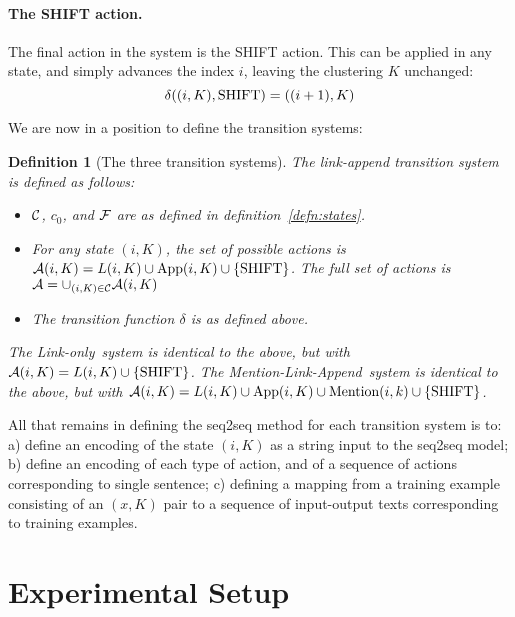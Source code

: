 \documentclass[11pt,a4paper]{article}
\newtheorem{definition}{Definition}
\newcommand{\M}{Mention-Link-Append}
\newcommand{\LO}{Link-only}
\begin{document}
\paragraph{The SHIFT action.}
The final action in the system is the SHIFT action. This can be applied in any state, and simply advances the index $i$, leaving the clustering $K$ unchanged:
\[
\delta((i,K), \hbox{SHIFT}) = ( (i+1), K)
\]

We are now in a position to define the transition systems:

\begin{definition}[The three transition systems]
The link-append transition system is defined as follows:
\begin{itemize}
    \item ${\cal C}$, $c_0$, and ${\cal F}$ are as defined in definition~\ref{defn:states}.
    \item For any state $(i, K)$, the set of possible actions is ${\cal A}(i, K) = L(i, K) \cup \hbox{App}(i, K) \cup \{\hbox{SHIFT}\}$. The full set of actions is ${\cal A} = \cup_{(i, K) \in {\cal C}} {\cal A}(i, K)$
    \item The transition function $\delta$ is as defined above.
\end{itemize}

The \LO~system is identical to the above, but with ${\cal A}(i, K) = L(i, K) \cup  \{\hbox{SHIFT}\}$. The \M~system is identical to the above, but with ${\cal A}(i, K) = L(i, K) \cup \hbox{App}(i, K) \cup \hbox{Mention}(i, k) \cup \{\hbox{SHIFT}\}$.

\end{definition}

All that remains in defining the seq2seq method for each transition system is to: a) define an encoding of the state $(i, K)$ as a string input to the seq2seq model; b) define an encoding of each type of action, and of a sequence of actions corresponding to single sentence; c) defining a mapping from a training example consisting of an $(x, K)$ pair to a sequence of input-output texts corresponding to training examples. 
%
 

\section{Experimental Setup}
\label{sec:experiments}

\end{document}
